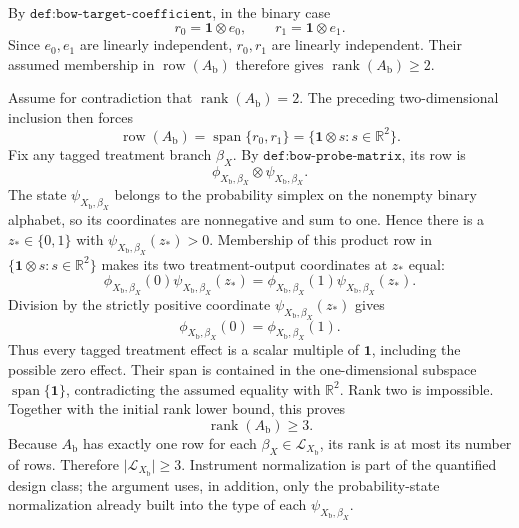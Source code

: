 By \(\texttt{def:bow-target-coefficient}\), in the binary case
\[
r_0=\mathbf 1\otimes e_0,
\qquad
r_1=\mathbf 1\otimes e_1.
\]
Since \(e_0,e_1\) are linearly independent, \(r_0,r_1\) are linearly independent.  Their assumed membership in \(\operatorname{row}(A_{\mathrm b})\) therefore gives \(\operatorname{rank}(A_{\mathrm b})\ge2\).

Assume for contradiction that \(\operatorname{rank}(A_{\mathrm b})=2\).  The preceding two-dimensional inclusion then forces
\[
\operatorname{row}(A_{\mathrm b})
=\operatorname{span}\{r_0,r_1\}
=\{\mathbf 1\otimes s:s\in\mathbb R^2\}.
\]
Fix any tagged treatment branch \(\beta_X\).  By \(\texttt{def:bow-probe-matrix}\), its row is
\[
\phi_{X_{\mathrm b},\beta_X}\otimes
\psi_{X_{\mathrm b},\beta_X}.
\]
The state \(\psi_{X_{\mathrm b},\beta_X}\) belongs to the probability simplex on the nonempty binary alphabet, so its coordinates are nonnegative and sum to one.  Hence there is a \(z_*\in\{0,1\}\) with \(\psi_{X_{\mathrm b},\beta_X}(z_*)>0\).  Membership of this product row in \(\{\mathbf 1\otimes s:s\in\mathbb R^2\}\) makes its two treatment-output coordinates at \(z_*\) equal:
\[
\phi_{X_{\mathrm b},\beta_X}(0)\psi_{X_{\mathrm b},\beta_X}(z_*)
=
\phi_{X_{\mathrm b},\beta_X}(1)\psi_{X_{\mathrm b},\beta_X}(z_*).
\]
Division by the strictly positive coordinate \(\psi_{X_{\mathrm b},\beta_X}(z_*)\) gives
\[
\phi_{X_{\mathrm b},\beta_X}(0)
=\phi_{X_{\mathrm b},\beta_X}(1).
\]
Thus every tagged treatment effect is a scalar multiple of \(\mathbf 1\), including the possible zero effect.  Their span is contained in the one-dimensional subspace \(\operatorname{span}\{\mathbf 1\}\), contradicting the assumed equality with \(\mathbb R^2\).  Rank two is impossible.  Together with the initial rank lower bound, this proves
\[
\operatorname{rank}(A_{\mathrm b})\ge3.
\]
Because \(A_{\mathrm b}\) has exactly one row for each \(\beta_X\in\mathcal L_{X_{\mathrm b}}\), its rank is at most its number of rows.  Therefore \(\lvert\mathcal L_{X_{\mathrm b}}\rvert\ge3\).  Instrument normalization is part of the quantified design class; the argument uses, in addition, only the probability-state normalization already built into the type of each \(\psi_{X_{\mathrm b},\beta_X}\).
